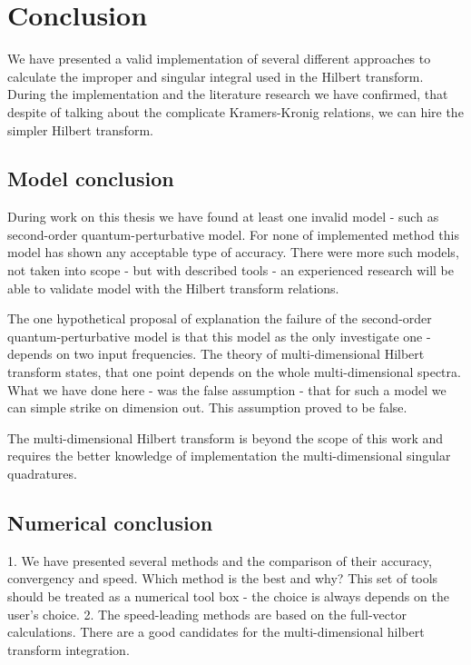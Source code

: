 \documentclass[12pt,twoside,a4paper]{article}
\numberwithin{equation}{subsection}
\numberwithin{figure}{subsection}
\begin{document}
\section{Conclusion} \label{chap:conclusion}

We have presented a valid implementation of several different approaches to calculate the improper and singular integral used in the Hilbert transform. During the implementation and the literature research we have confirmed, that despite of talking about the complicate Kramers-Kronig relations, we can hire the simpler Hilbert transform.

\subsection{Model conclusion} \label{chap:conclusion_model}


During work on this thesis we have found at least one invalid model - such as second-order quantum-perturbative model. For none of implemented method this model has shown any acceptable type of accuracy. There were more such models, not taken into scope - but with described tools - an experienced research will be able to validate model with the Hilbert transform relations.

The one hypothetical proposal of explanation the failure of the second-order quantum-perturbative model is that this model as the only investigate one - depends on two input frequencies. The theory of multi-dimensional Hilbert transform states, that one point depends on the whole multi-dimensional spectra. What we have done here - was the false assumption - that for such a model we can simple strike on dimension out. This assumption proved to be false. 

The multi-dimensional Hilbert transform is beyond the scope of this work and requires the better knowledge of implementation the multi-dimensional singular quadratures.


\subsection{Numerical conclusion} \label{chap:conclusion_numerical}


1. We have presented several methods and the comparison of their accuracy, convergency and speed. Which method is the best and why? This set of tools should be treated as a numerical tool box - the choice is always depends on the user's choice.
2. The speed-leading methods are based on the full-vector calculations. There are a good candidates for the multi-dimensional hilbert transform integration.
\end{document}
